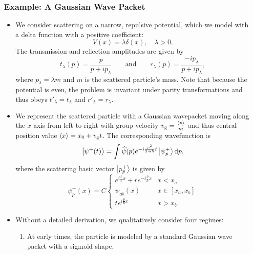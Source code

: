 \documentclass[11pt, a4paper]{article}
\newcommand{\diff}{\mathop{}\!\mathrm{d}} %
\newcommand{\F}[1]{\widehat{#1}} %
\begin{document}
\subsubsection{Example: A Gaussian Wave Packet}
\begin{itemize}
    \item We consider scattering on a narrow, repulsive potential, which we model with a delta function with a positive coefficient:
    \begin{equation*}
        V(x) = \lambda \delta(x), \quad \lambda > 0.
    \end{equation*}
    The transmission and reflection amplitudes are given by
    \begin{equation*}
        t_{\lambda}(p) = \frac{p}{p + ip_{\lambda}} \qquad \text{and} \qquad r_{\lambda}(p) = \frac{-ip_{\lambda}}{p + ip_{\lambda}},
    \end{equation*}
    where $ p_{\lambda} = \lambda m $ and $ m $ is the scattered particle's mass. Note that because the potential is even, the problem is invariant under parity transformations and thus obeys $ t'_{\lambda} = t_{\lambda} $ and $ r'_{\lambda} = r_{\lambda} $.

    \item We represent the scattered particle with a Gaussian wavepacket moving along the $ x $ axis from left to right with group velocity $ v_{\text{g}} = \frac{\ev{p}}{m} $ and thus central position value $ \ev{x} = x_{0} + v_{\text{g}}t $. The corresponding wavefunction is
    \begin{equation*}
        \ket{\psi^{+}(t)} = \int \F{\psi}(p) e^{-i \frac{p^{2}}{2m \hbar}t } \ket{\psi_{p}^{+}} \diff p,
    \end{equation*}
    where the scattering basic vector $ \ket{p_{p}^{+}} $ is given by 
    \begin{equation*}
        \psi_{p}^{+}(x) = C
        \begin{cases}
            e^{i \frac{p}{\hbar} x} + r e^{-i \frac{p}{\hbar} x} & x < x_{a}\\
            \psi_{ab}(x) & x \in [x_{a}, x_{b}]\\
            t e^{i \frac{p}{\hbar}x} & x > x_{b}.
        \end{cases}
    \end{equation*}
    
    \item Without a detailed derivation, we qualitatively consider four regimes:
    \begin{enumerate}
        \item At early times, the particle is modeled by a standard Gaussian wave packet with a sigmoid shape. 


\end{enumerate}
\end{itemize}
\end{document}
